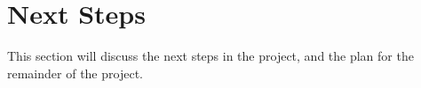 \section{Next Steps}
This section will discuss the next steps in the project, and the plan for the remainder of the project.